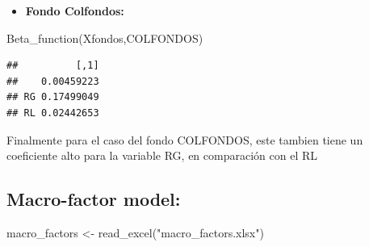 \documentclass[
  12pt,
]{article}
\newenvironment{Shaded}{\begin{snugshade}}{\end{snugshade}}
\newcommand{\DecValTok}[1]{\textcolor[rgb]{0.00,0.00,0.81}{#1}}
\newcommand{\FunctionTok}[1]{\textcolor[rgb]{0.00,0.00,0.00}{#1}}
\newcommand{\NormalTok}[1]{#1}
\newcommand{\OtherTok}[1]{\textcolor[rgb]{0.56,0.35,0.01}{#1}}
\newcommand{\SpecialCharTok}[1]{\textcolor[rgb]{0.00,0.00,0.00}{#1}}
\newcommand{\StringTok}[1]{\textcolor[rgb]{0.31,0.60,0.02}{#1}}
\providecommand{\tightlist}{%
  \setlength{\itemsep}{0pt}\setlength{\parskip}{0pt}}
\begin{document}
\begin{itemize}
\tightlist
\item
  \textbf{Fondo Colfondos:}
\end{itemize}

\begin{Shaded}
\begin{Highlighting}[]
\FunctionTok{Beta\_function}\NormalTok{(Xfondos,COLFONDOS)}
\end{Highlighting}
\end{Shaded}

\begin{verbatim}
##          [,1]
##    0.00459223
## RG 0.17499049
## RL 0.02442653
\end{verbatim}

Finalmente para el caso del fondo COLFONDOS, este tambien tiene un
coeficiente alto para la variable RG, en comparación con el RL

\hypertarget{macro-factor-model}{%
\subsection{Macro-factor model:}\label{macro-factor-model}}

\begin{Shaded}
\begin{Highlighting}[]
\NormalTok{macro\_factors }\OtherTok{\textless{}{-}} \FunctionTok{read\_excel}\NormalTok{(}\StringTok{"macro\_factors.xlsx"}\NormalTok{)}
\end{Highlighting}
\end{Shaded}

\begin{Shaded}
\end{Shaded}
\end{document}
